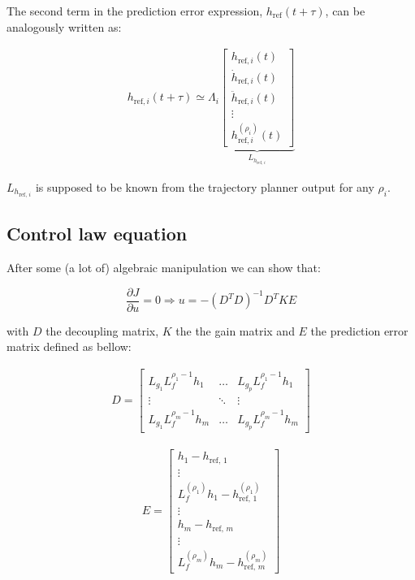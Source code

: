 \documentclass[letterpaper, 10 pt, conference]{ieeeconf}  %
\begin{document}

The second term in the prediction error expression, $h_{\text{ref}}(t+\tau)$, can be analogously written as:

\begin{eqnarray}
h_{\text{ref},i}(t+\tau) \simeq \Lambda_i
\underbrace{\left[\begin{array}{c}
h_{\text{ref},i}(t)\\
\dot{h}_{\text{ref},i}(t)\\
\ddot{h}_{\text{ref},i}(t)\\
\vdots\\
h^{({\rho_i})}_{\text{ref},i}(t)
\end{array}\right]}_{L_{h_{\text{ref},\,i}}}
\end{eqnarray}

$L_{h_{\text{ref},\, i}}$ is supposed to be known from the trajectory planner output for any $\rho_i$.

\subsection{Control law equation}

After some (a lot of) algebraic manipulation we can show that:

\[
\frac{\partial J}{\partial u} = 0 \Rightarrow u = -(D^TD)^{-1}D^TKE
\]

with $D$ the decoupling matrix, $K$ the the gain matrix and $E$ the prediction error matrix defined as bellow:

\begin{eqnarray}
D = 
\left[\begin{array}{ccc}
L_{g_1}L_f^{\rho_1-1}h_1 & \dots & L_{g_p}L_f^{\rho_1-1}h_1\\
\vdots & \ddots & \vdots\\
L_{g_1}L_f^{\rho_m-1}h_m & \dots & L_{g_p}L_f^{\rho_m-1}h_m
\end{array}\right]
\end{eqnarray}

\begin{eqnarray}
E = 
\left[\begin{array}{c}
h_1 - h_{\text{ref},\,1}\\
\vdots\\
L_f^{(\rho_1)}h_1 - h^{(\rho_1)}_{\text{ref},\,1}\\
\vdots\\
h_m - h_{\text{ref},\,m}\\
\vdots\\
L_f^{(\rho_m)}h_m - h^{(\rho_m)}_{\text{ref},\,m}
\end{array}\right]
\end{eqnarray}
\end{document}
